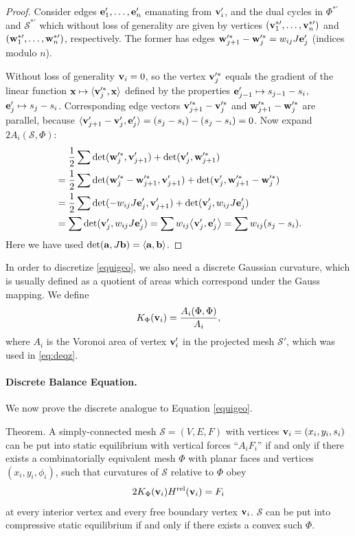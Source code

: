 \documentclass[annual]{acmsiggraph}
\def\<{\mathchoice{\big\langle}{\langle}{\langle}{\langle}}
\def\>{\mathchoice{\big\rangle}{\rangle}{\rangle}{\rangle}}
\def\rel{{\mathord{\text{\rm rel}}}}
\def\SS{{\mathcal S}}
\begin{document}
\begin{proof} Consider edges ${\mathbf e}'_1,\dots,{\mathbf e}'_n$ emanating from
${\mathbf v}_i'$, and the dual cycles in $\Phi^{*\prime}$ and $\SS^{*\prime}$
which without loss of generality are given by vertices
$({\mathbf v}^{*\prime}_1,\dots,{\mathbf v}^{*\prime}_n)$ and
$({\mathbf w}^{*\prime}_1,\dots,{\mathbf w}^{*\prime}_n)$, respectively. The former has
edges ${\mathbf w}'^*_{j+1}-{\mathbf w}'^*_j = w_{ij} J{\mathbf e}'_j$ (indices modulo $n$).

Without loss of generality ${\mathbf v}_i=0$, so the vertex ${\mathbf v}'^*_j$ equals the
gradient of the linear function $\xw\mapsto \<\vw'^*_j,\xw\>$ defined by
the properties ${\mathbf e}'_{j-1}\mapsto s_{j-1}-s_i$, ${\mathbf e}'_j\mapsto s_j-s_i$.
Corresponding edge vectors ${\mathbf v}'^*_{j+1}-{\mathbf v}'^*_j$ and
${\mathbf w}'^*_{j+1}-{\mathbf w}'^*_j$ are parallel, because
$\<\vw'_{j+1}-\vw'_j,\ew'_j\>=(s_j-s_i)-(s_j-s_i)=0$. Now expand
$2A_i(\SS,\Phi)$:
	\begin{align*}
	& \mathrel{\hphantom{=}}
		{1\over 2}\sum
		\det(\ww'^*_j, \vw'_{j+1}) + \det(\vw'_j, \ww'^*_{j+1})
	\\
	&=
		{1\over 2}\sum
		\det(\ww'^*_j-\ww'^*_{j+1}, \vw'_{j+1})
		+ \det(\vw'_j, \ww'^*_{j+1}-\ww'^*_j)
		\\
	&=
		{1\over 2}\sum
		\det( - w_{ij} J\ew'_j, \vw'_{j+1})
	 	+ \det(\vw'_j,w_{ij} J\ew'_j)
	\\
	&= 	 \sum \det( \vw'_j, w_{ij} J\ew'_j)
	=	 \sum	w_{ij} \< \vw'_j, \ew'_j\>
	= 	 \sum  w_{ij} (s_j-s_i).
	\end{align*}
 Here we have used $\det(\aw,J\bw)=\<\aw,\bw\>$.
 \end{proof}


In order to discretize \eqref{equigeo}, we also need a discrete Gaussian
curvature, which is usually defined as a quotient of areas which
correspond under the Gauss mapping. We define
	$$
	K_\Phi({\mathbf v}_i) = {A_i(\Phi,\Phi) \over A_i},
	$$
 where $A_i$ is the Voronoi area of vertex ${\mathbf v}_i'$ in the projected mesh
$\SS'$, which was used in \eqref{eq:deqz}.

\paragraph{Discrete Balance Equation.}

We now prove the discrete analogue to Equation \eqref{equigeo}.

\proclaim Theorem.
 A simply-connected mesh $\SS=(V,E,F)$ with vertices ${\mathbf v}_i=(x_i,y_i,s_i)$
can be put into static equilibrium with vertical forces ``$A_iF_i$'' if
and only if there exists a combinatorially equivalent mesh $\Phi$ with
planar faces and vertices $(x_i,y_i,\phi_i)$, such that curvatures of
$\SS$ relative to $\Phi$ obey
	\begin{equation}
	2 K_\Phi(\vw_i) H^\rel(\vw_i) = F_i
	\label{eq:deqiso}
	\end{equation}
 at every interior vertex and every free boundary vertex ${\mathbf v}_i$. $\SS$
can be put into compressive static equilibrium if and only if there exists
a convex such $\Phi$.
\end{document}
